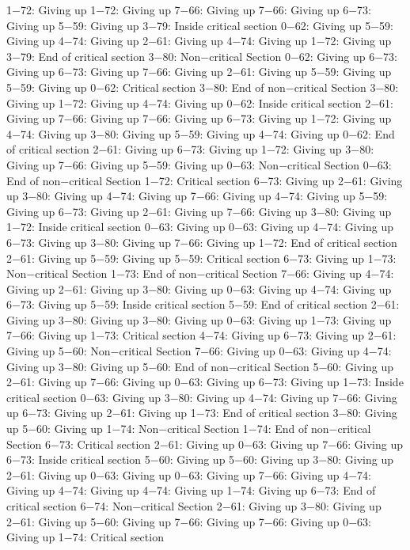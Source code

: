 1−72: Giving up
1−72: Giving up
7−66: Giving up
7−66: Giving up
6−73: Giving up
5−59: Giving up
3−79: Inside critical section
0−62: Giving up
5−59: Giving up
4−74: Giving up
2−61: Giving up
4−74: Giving up
1−72: Giving up
3−79: End of critical section
3−80: Non−critical Section
0−62: Giving up
6−73: Giving up
6−73: Giving up
7−66: Giving up
2−61: Giving up
5−59: Giving up
5−59: Giving up
0−62: Critical section
3−80: End of non−critical Section
3−80: Giving up
1−72: Giving up
4−74: Giving up
0−62: Inside critical section
2−61: Giving up
7−66: Giving up
7−66: Giving up
6−73: Giving up
1−72: Giving up
4−74: Giving up
3−80: Giving up
5−59: Giving up
4−74: Giving up
0−62: End of critical section
2−61: Giving up
6−73: Giving up
1−72: Giving up
3−80: Giving up
7−66: Giving up
5−59: Giving up
0−63: Non−critical Section
0−63: End of non−critical Section
1−72: Critical section
6−73: Giving up
2−61: Giving up
3−80: Giving up
4−74: Giving up
7−66: Giving up
4−74: Giving up
5−59: Giving up
6−73: Giving up
2−61: Giving up
7−66: Giving up
3−80: Giving up
1−72: Inside critical section
0−63: Giving up
0−63: Giving up
4−74: Giving up
6−73: Giving up
3−80: Giving up
7−66: Giving up
1−72: End of critical section
2−61: Giving up
5−59: Giving up
5−59: Critical section
6−73: Giving up
1−73: Non−critical Section
1−73: End of non−critical Section
7−66: Giving up
4−74: Giving up
2−61: Giving up
3−80: Giving up
0−63: Giving up
4−74: Giving up
6−73: Giving up
5−59: Inside critical section
5−59: End of critical section
2−61: Giving up
3−80: Giving up
3−80: Giving up
0−63: Giving up
1−73: Giving up
7−66: Giving up
1−73: Critical section
4−74: Giving up
6−73: Giving up
2−61: Giving up
5−60: Non−critical Section
7−66: Giving up
0−63: Giving up
4−74: Giving up
3−80: Giving up
5−60: End of non−critical Section
5−60: Giving up
2−61: Giving up
7−66: Giving up
0−63: Giving up
6−73: Giving up
1−73: Inside critical section
0−63: Giving up
3−80: Giving up
4−74: Giving up
7−66: Giving up
6−73: Giving up
2−61: Giving up
1−73: End of critical section
3−80: Giving up
5−60: Giving up
1−74: Non−critical Section
1−74: End of non−critical Section
6−73: Critical section
2−61: Giving up
0−63: Giving up
7−66: Giving up
6−73: Inside critical section
5−60: Giving up
5−60: Giving up
3−80: Giving up
2−61: Giving up
0−63: Giving up
0−63: Giving up
7−66: Giving up
4−74: Giving up
4−74: Giving up
4−74: Giving up
1−74: Giving up
6−73: End of critical section
6−74: Non−critical Section
2−61: Giving up
3−80: Giving up
2−61: Giving up
5−60: Giving up
7−66: Giving up
7−66: Giving up
0−63: Giving up
1−74: Critical section
